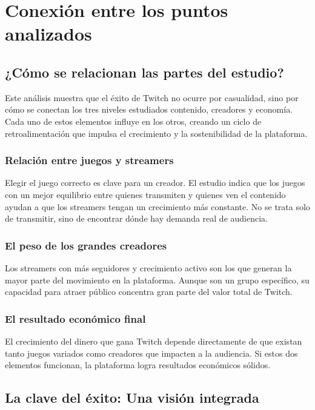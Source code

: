 \documentclass[12pt,a4paper]{article}
\begin{document}
\section{Conexión entre los puntos analizados}
\subsection{¿Cómo se relacionan las partes del estudio?} 

Este análisis muestra que el éxito de Twitch no ocurre por casualidad, sino por cómo se conectan los tres niveles estudiados contenido, creadores y economía. Cada uno de estos elementos influye en los otros, creando un ciclo de retroalimentación que impulsa el crecimiento y la sostenibilidad de la plataforma.

\subsubsection{Relación entre juegos y streamers} 
Elegir el juego correcto es clave para un creador. El estudio indica que los juegos con un mejor equilibrio entre quienes transmiten y quienes ven el contenido ayudan a que los streamers tengan un crecimiento más constante. No se trata solo de transmitir, sino de encontrar dónde hay demanda real de audiencia.

\subsubsection{El peso de los grandes creadores} 
Los streamers con más seguidores y crecimiento activo son los que generan la mayor parte del movimiento en la plataforma. Aunque son un grupo específico, su capacidad para atraer público concentra gran parte del valor total de Twitch.

\subsubsection{El resultado económico final} 
El crecimiento del dinero que gana Twitch depende directamente de que existan tanto juegos variados como creadores que impacten a la audiencia. Si estos dos elementos funcionan, la plataforma logra resultados económicos sólidos.

\subsection{La clave del éxito: Una visión integrada} 
\end{document}
